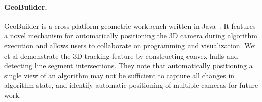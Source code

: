 






\paragraph{GeoBuilder.}

GeoBuilder is a cross-platform geometric workbench written in
Java~\cite{wei2009geobuilder}. It features a novel mechanism for automatically
positioning the 3D camera during algorithm execution and allows users to
collaborate on programming and visualization. Wei et al demonstrate the 3D
tracking feature by constructing convex hulls and detecting line segment
intersections. They note that automatically positioning a single view of an
algorithm may not be sufficient to capture all changes in algorithm state, and
identify automatic positioning of multiple cameras for future work.

